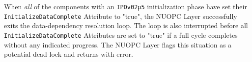 When {\em all} of the components with an {\tt IPDv02p5} initialization phase have set their {\tt InitializeDataComplete} Attribute to "true", the NUOPC Layer successfully exits the data-dependency resolution loop. The loop is also interrupted before all {\tt InitializeDataComplete} Attributes are set to "true" if a full cycle completes without any indicated progress. The NUOPC Layer flags this situation as a potential dead-lock and returns with error.
